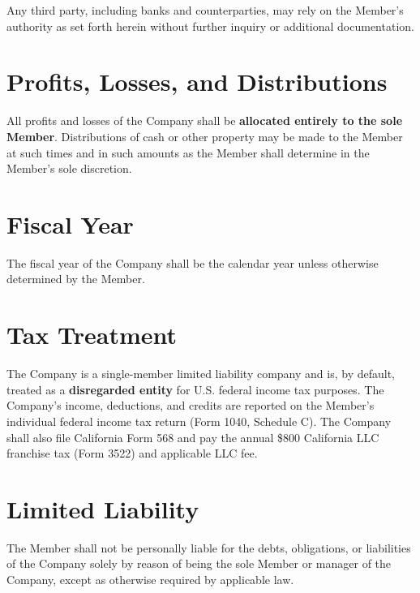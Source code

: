\documentclass{toospoint}
\begin{document}
Any third party, including banks and counterparties, may rely on the
Member's authority as set forth herein without further inquiry or
additional documentation.

\section{Profits, Losses, and Distributions}

All profits and losses of the Company shall be \textbf{allocated entirely
to the sole Member}. Distributions of cash or other property may be made
to the Member at such times and in such amounts as the Member shall
determine in the Member's sole discretion.

\section{Fiscal Year}

The fiscal year of the Company shall be the calendar year unless otherwise
determined by the Member.

\section{Tax Treatment}

The Company is a single-member limited liability company and is, by
default, treated as a \textbf{disregarded entity} for U.S. federal income
tax purposes. The Company's income, deductions, and credits are reported
on the Member's individual federal income tax return (Form 1040,
Schedule C). The Company shall also file California Form 568 and pay the
annual \$800 California LLC franchise tax (Form 3522) and applicable
LLC fee.

\section{Limited Liability}

The Member shall not be personally liable for the debts, obligations, or
liabilities of the Company solely by reason of being the sole Member or
manager of the Company, except as otherwise required by applicable law.
\end{document}
